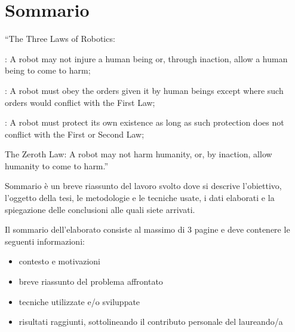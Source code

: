 \chapter*{Sommario} %
\label{sommario}


“The Three Laws of Robotics:

: A robot may not injure a human being or, through inaction, allow a human being to come to harm;

: A robot must obey the orders given it by human beings except where such orders would conflict with the First Law;

: A robot must protect its own existence as long as such protection does not conflict with the First or Second Law;

\noindent The Zeroth Law: A robot may not harm humanity, or, by inaction, allow humanity to come to harm.”


Sommario è un breve riassunto del lavoro svolto dove si descrive l'obiettivo, l'oggetto della tesi, le metodologie e le tecniche usate, i dati elaborati e la spiegazione delle conclusioni alle quali siete arrivati.  

Il sommario dell’elaborato consiste al massimo di 3 pagine e deve contenere le seguenti informazioni:
\begin{itemize}
  \item contesto e motivazioni 
  \item breve riassunto del problema affrontato
  \item tecniche utilizzate e/o sviluppate
  \item risultati raggiunti, sottolineando il contributo personale del laureando/a
\end{itemize}